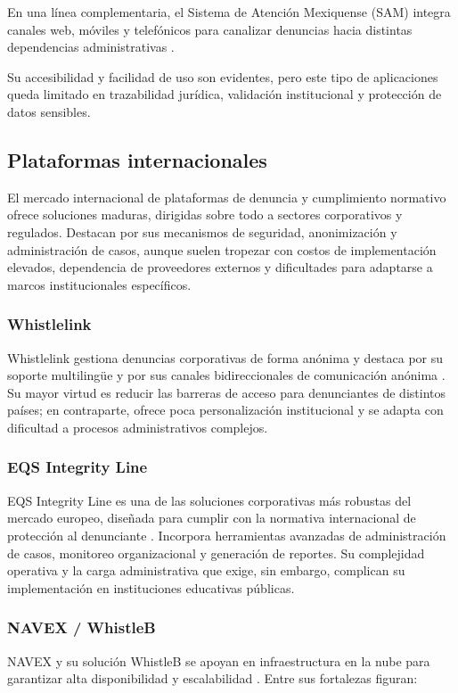 	En una línea complementaria, el Sistema de Atención Mexiquense (SAM) integra canales web, móviles y
	telefónicos para canalizar denuncias hacia distintas dependencias administrativas
	\cite{secogem_sam}.
	
	Su accesibilidad y facilidad de uso son evidentes, pero este tipo de aplicaciones queda limitado en
	trazabilidad jurídica, validación institucional y protección de datos sensibles.
	
	\subsection{Plataformas internacionales}
	El mercado internacional de plataformas de denuncia y cumplimiento normativo ofrece soluciones
	maduras, dirigidas sobre todo a sectores corporativos y regulados. Destacan por sus mecanismos de
	seguridad, anonimización y administración de casos, aunque suelen tropezar con costos de
	implementación elevados, dependencia de proveedores externos y dificultades para adaptarse a marcos
	institucionales específicos.
	
	\subsubsection{Whistlelink}
	Whistlelink gestiona denuncias corporativas de forma anónima y destaca por su soporte multilingüe y
	por sus canales bidireccionales de comunicación anónima \cite{whistlelink}. Su mayor virtud es
	reducir las barreras de acceso para denunciantes de distintos países; en contraparte, ofrece poca
	personalización institucional y se adapta con dificultad a procesos administrativos complejos.
	
	\subsubsection{EQS Integrity Line}
	EQS Integrity Line es una de las soluciones corporativas más robustas del mercado europeo, diseñada
	para cumplir con la normativa internacional de protección al denunciante \cite{eqs_integrity_line}.
	Incorpora herramientas avanzadas de administración de casos, monitoreo organizacional y generación
	de reportes. Su complejidad operativa y la carga administrativa que exige, sin embargo, complican su
	implementación en instituciones educativas públicas.
	
	\subsubsection{NAVEX / WhistleB}
	NAVEX y su solución WhistleB se apoyan en infraestructura en la nube para garantizar alta
	disponibilidad y escalabilidad \cite{navex_whistleb}. Entre sus fortalezas figuran:
	
